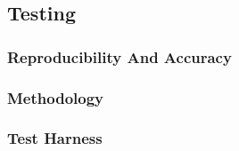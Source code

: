 \subsection{Testing}
  \subsubsection{Reproducibility And Accuracy}
  \subsubsection{Methodology}
  \subsubsection{Test Harness}
